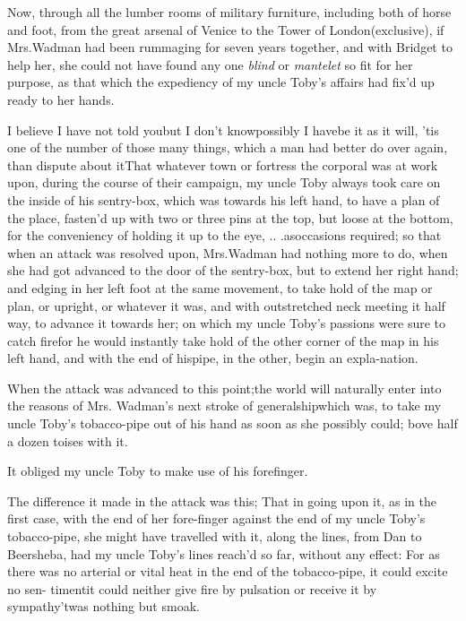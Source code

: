 \documentclass{article}
\begin{document}
Now, through all the lumber rooms of military furniture,
including both of horse and foot, from the great arsenal\break 
of Venice to the Tower of London\break (exclusive), if
Mrs.\@ Wadman had been rummaging for seven years together, and
with Bridget to help her, she could not have found any one
\textit{blind} or \textit{man\-telet} so fit for her purpose, as that
which the expediency of my uncle Toby’s affairs had
fix’d up ready to her hands.

I believe I have not told you\tsh but I don’t know\tsh possibly I have\tsh be it
as it will, ’tis one of the number of those many things, which a man had better do
over again, than dispute about it\tsk That whatever town or fortress the corporal was
at work upon, during the course of their campaign, my uncle Toby always took care
on the inside of his sentry-box, which was towards his left hand, to have a plan of
the place, fasten’d up with two or three pins at the top, but loose at the bottom,
for the conveniency of holding it up to the eye, \etc .\@ .\@
.\@ as\break occasions required;
so that when an attack was resolved upon, Mrs.\@ Wadman had nothing more to do, when
she had got advanced to the door of the sentry-box, but to extend her right hand;
and edging in her left foot at the same movement, to take hold of the map or plan,
or upright, or whatever it was, and with outstretched neck meeting it half way, \tsk 
to advance it towards her; on which my uncle Toby’s passions
were sure to catch fire\tsh for he would instantly take hold of
the other corner of the map in his left hand, and with the end
of his\break pipe, in the other, begin an expla-\break nation.

When the attack was advanced to this point;\tsh the
world will naturally enter into the reasons of Mrs.
Wadman’s next stroke of generalship\tsh which
was, to take my uncle Toby’s tobacco-pipe out of his
hand as soon as she possibly could;
bove half a dozen toises with it.

\tsk  It obliged my uncle Toby to make use of his
forefinger.

The difference it made in the attack was this; That in going upon it, as in the
first case, with the end of her fore-finger against the end of my uncle Toby’s
tobacco-pipe, she might have travelled with it, along the lines, from Dan to
Beersheba, had my uncle Toby’s lines reach’d so far, without any effect: For as
there was no arterial or vital heat in the end of the tobacco-pipe, it could excite
no sen- timent\tsh it could neither give fire by pulsation \tsh or receive it by
sympathy\break\null\tsh ’twas nothing but smoak.
\end{document}
